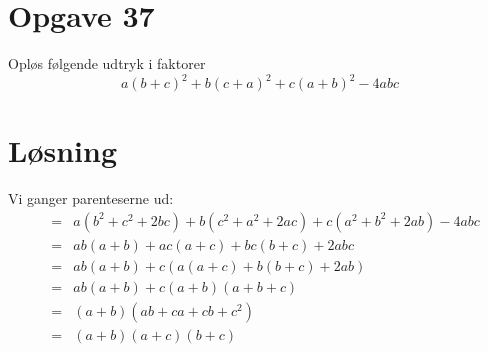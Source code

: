 \documentclass[12pt,oneside,a4paper]{article}
\newcommand{\bas}{\begin{eqnarray*}}
\newcommand{\eas}{\end{eqnarray*}}
\begin{document}
\section{Opgave 37}
Opløs følgende udtryk i faktorer
$$
a(b+c)^2+b(c+a)^2+c(a+b)^2-4abc
$$

\section{Løsning}
Vi ganger parenteserne ud:
\bas
&=& a(b^2+c^2+2bc) + b(c^2+a^2+2ac) + c(a^2+b^2+2ab)-4abc \\
&=& ab(a+b)+ac(a+c)+bc(b+c)+2abc \\
&=& ab(a+b) + c\left(a(a+c)+b(b+c)+2ab\right) \\
&=& ab(a+b) + c(a+b)(a+b+c) \\
&=& (a+b)(ab+ca+cb+c^2) \\
&=& (a+b)(a+c)(b+c)
\eas
\end{document}
